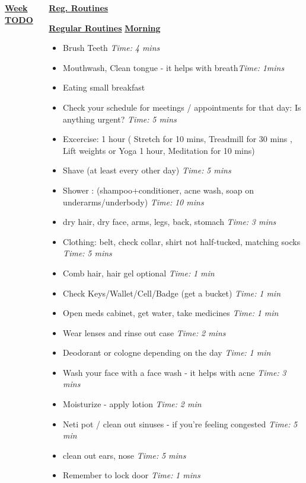 \documentclass[serif,mathserif,final]{beamer}
\newcommand{\timeEst}[1]{\textit{Time:} \textit{#1}}
\begin{document}
\begin{frame}{}
\begin{columns}[t]
\begin{column}{0.33\linewidth}{\textbf{\underline{Week TODO}}}
\begin{block}
\end{block} 

\end{column}%



\begin{column}{0.27\linewidth} {\textbf{\underline{Reg. Routines}}}

\begin{block}{\small \textbf{\underline{Regular Routines}} }
\underline{\textbf{Morning}}
\begin{itemize}
\item \tiny Brush Teeth \timeEst{4 mins}
\item \tiny Mouthwash, Clean tongue - it helps with breath\timeEst{1mins} 
\item \tiny Eating small breakfast
\item \tiny Check your schedule for meetings / appointments for that day: Is anything urgent? \timeEst{5 mins}
\item \tiny Excercise: 1 hour ( Stretch for 10 mins, Treadmill for 30 mins , Lift weights or Yoga 1 hour, Meditation for 10 mins)
\item \tiny Shave (at least every other day) \timeEst{5 mins}
\item \tiny Shower : (shampoo+conditioner, acne wash,  soap on underarms/underbody)
\timeEst{10 mins}
\item \tiny dry hair, dry face, arms, legs, back, stomach \timeEst{3 mins}
\item \tiny Clothing: belt, check collar, shirt not half-tucked, matching socks \timeEst{5 mins}
\item \tiny Comb hair, hair gel optional \timeEst{ 1 min}
\item \tiny Check Keys/Wallet/Cell/Badge (get a bucket) \timeEst{1 min}
\item \tiny Open meds cabinet, get water, take medicines \timeEst{1 min}
\item \tiny Wear lenses and rinse out case \timeEst{ 2 mins}
\item \tiny Deodorant or cologne depending on the day \timeEst{1 min}
\item \tiny Wash your face with a face wash - it helps with acne \timeEst{3 mins}
\item \tiny Moisturize - apply lotion \timeEst{ 2 min}
\item \tiny Neti pot / clean out sinuses - if you’re feeling congested \timeEst{5 min}
\item \tiny clean out ears, nose \timeEst{5 mins}
\item \tiny Remember to lock door \timeEst{1 mins}
\end{itemize}


\end{block}
\end{column}
\end{columns}
\end{frame}
\end{document}
